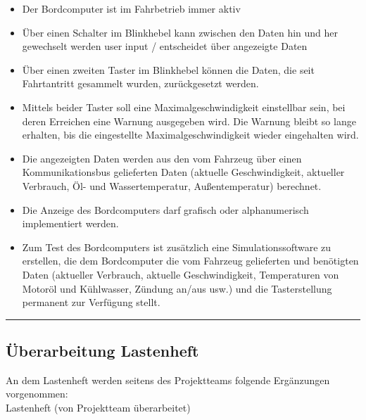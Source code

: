 \documentclass[a4paper,12pt]{article}
\begin{document}
\begin{itemize}

\item Der Bordcomputer ist im Fahrbetrieb immer aktiv 
\item Über einen Schalter im Blinkhebel kann zwischen den Daten hin und her gewechselt werden 
user input / entscheidet über angezeigte Daten
\item Über einen zweiten Taster im Blinkhebel können die Daten, die seit Fahrtantritt gesammelt wurden, zurückgesetzt werden.
\item Mittels beider Taster soll eine Maximalgeschwindigkeit einstellbar sein, bei deren Erreichen eine Warnung ausgegeben wird. Die Warnung bleibt so lange erhalten, bis die eingestellte Maximalgeschwindigkeit wieder eingehalten wird.
\item Die angezeigten Daten werden aus den vom Fahrzeug über einen Kommunikations­bus gelieferten Daten (aktuelle Geschwindigkeit, aktueller Verbrauch, Öl- und Wassertemperatur, Außentemperatur) berechnet. 
\item Die Anzeige des Bordcomputers darf grafisch oder alphanumerisch implementiert werden.
\item Zum Test des Bordcomputers ist zusätzlich eine Simulationssoftware zu erstellen, die dem Bordcomputer die vom Fahrzeug gelieferten und benötigten Daten (aktueller Verbrauch, aktuelle Geschwindigkeit, Temperaturen von Motoröl und Kühlwasser, Zündung an/aus usw.) und die Tasterstellung permanent zur Verfügung stellt.

\end{itemize}
\noindent\rule{16cm}{0.4pt}

\subsection{Überarbeitung Lastenheft}

An dem Lastenheft werden seitens des Projektteams folgende Ergänzungen vorgenommen:\\

Lastenheft (von Projektteam überarbeitet)
\end{document}
